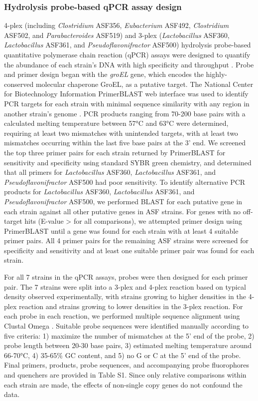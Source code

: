 \documentclass[11pt,twocolumn,notitlepage,openany,twoside]{book}
\begin{document}
\begin{refsection}
\subsubsection{Hydrolysis probe-based qPCR assay design}
4-plex (including \textit{Clostridium} ASF356, \textit{Eubacterium} ASF492, \textit{Clostridium} ASF502, and \textit{Parabacteroides} ASF519) and 3-plex (\textit{Lactobacillus} ASF360, \textit{Lactobacillus} ASF361, and \textit{Pseudoflavonifractor} ASF500) hydrolysis probe-based quantitative polymerase chain reaction (qPCR) assays were designed to quantify the abundance of each strain’s DNA with high specificity and throughput \cite{Holland1991-gw}. Probe and primer design began with the \textit{groEL} gene, which encodes the highly-conserved molecular chaperone GroEL, as a putative target. The National Center for Biotechnology Information PrimerBLAST web interface was used to identify PCR targets for each strain with minimal sequence similarity with any region in another strain’s genome \cite{Ye2012-eb}. PCR products ranging from 70-200 base pairs with a calculated melting temperature between 57°C and 63°C were determined, requiring at least two mismatches with unintended targets, with at least two mismatches occurring within the last five base pairs at the 3’ end. We screened the top three primer pairs for each strain returned by PrimerBLAST for sensitivity and specificity using standard SYBR green chemistry, and determined that all primers for \textit{Lactobacillus} ASF360, \textit{Lactobacillus} ASF361, and \textit{Pseudoflavonifractor} ASF500 had poor sensitivity. To identify alternative PCR products for \textit{Lactobacillus} ASF360, \textit{Lactobacillus} ASF361, and \textit{Pseudoflavonifractor} ASF500, we performed BLAST for each putative gene in each strain against all other putative genes in ASF strains. For genes with no off-target hits (E-value \textgreater{} for all comparisons), we attempted primer design using PrimerBLAST until a gene was found for each strain with at least 4 suitable primer pairs. All 4 primer pairs for the remaining ASF strains were screened for specificity and sensitivity and at least one suitable primer pair was found for each strain.

For all 7 strains in the qPCR assays, probes were then designed for each primer pair. The 7 strains were split into a 3-plex and 4-plex reaction based on typical density observed experimentally, with strains growing to higher densities in the 4-plex reaction and strains growing to lower densities in the 3-plex reaction. For each probe in each reaction, we performed multiple sequence alignment using Clustal Omega \cite{Sievers2011-bk}. Suitable probe sequences were identified manually according to five criteria: 1) maximize the number of mismatches at the 5’ end of the probe, 2) probe length between 20-30 base pairs, 3) estimated melting temperature around 66-70°C, 4) 35-65\% GC content, and 5) no G or C at the 5’ end of the probe. Final primers, products, probe sequences, and accompanying probe fluorophores and quenchers are provided in Table S1. Since only relative comparisons within each strain are made, the effects of non-single copy genes do not confound the data.


\end{refsection}
\end{document}
